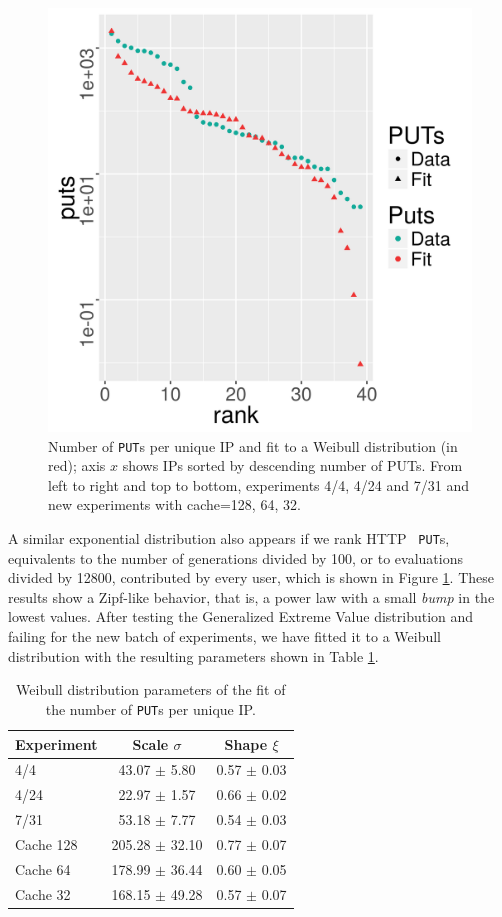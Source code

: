 \documentclass[letterpaper]{article}
\begin{document}
\begin{figure}[!htb]
\includegraphics[width=0.32\linewidth]{weibull-fit-cache=32.png}
\caption{Number of {\tt PUT}s per unique IP and fit to a Weibull
  distribution (in red); axis $x$ shows IPs sorted by descending
  number of PUTs. From left to right and top to bottom, experiments
  4/4, 4/24 and 7/31 and new experiments with cache=128, 64, 32.} 
\label{fig:puts:os}
\end{figure}
%
A similar exponential distribution also appears if we rank HTTP {\tt
  PUT}s, equivalents to the number of 
generations divided by 100, or to evaluations divided by 12800,
contributed by every user, which is shown 
in Figure \ref{fig:puts:os}. These results show a Zipf-like behavior,
that is, a power law with a small {\em bump} in the lowest
values. After testing the Generalized Extreme Value distribution and
failing for the new batch of experiments, we have fitted it to a
Weibull distribution \cite{thoman1969inferences} with the resulting
parameters shown in Table \ref{tab:puts:os}. 
%
\begin{table}
\caption{Weibull distribution  parameters of the fit of
  the number of {\tt PUT}s per unique IP. \label{tab:puts:os}}
\begin{center}
\begin{tabular}{l|cc}
\hline
Experiment  &  Scale $\sigma$ & Shape $\xi$ \\
\hline
4/4 &  43.07 $\pm$ 5.80 &  0.57 $\pm$ 0.03 \\
4/24 & 22.97 $\pm$ 1.57 & 0.66 $\pm$  0.02  \\
7/31 &  53.18 $\pm$ 7.77 &  0.54 $\pm$ 0.03   \\
\hline
Cache 128 & 205.28 $\pm$ 32.10 & 0.77 $\pm$ 0.07 \\ 
Cache 64 & 178.99 $\pm$ 36.44 & 0.60 $\pm$ 0.05 \\ 
Cache 32 & 168.15 $\pm$ 49.28 & 0.57 $\pm$ 0.07 \\
\hline
\end{tabular}
\end{center}
\end{table}
\end{document}
